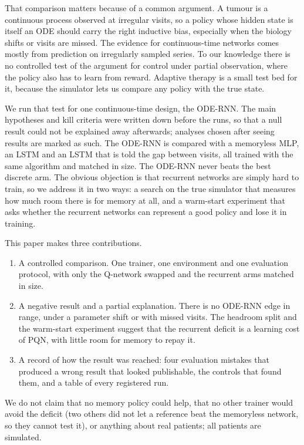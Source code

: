 \documentclass[10pt]{article}
\renewcommand{\cite}{\citep}
\begin{document}
That comparison matters because of a common argument. A tumour is a continuous
process observed at irregular visits, so a policy whose hidden state is itself
an ODE \cite{rubanova2019} should carry the right inductive bias, especially
when the biology shifts or visits are missed. The evidence for continuous-time
networks comes mostly from prediction on irregularly sampled series. To our knowledge
there is no controlled test of the argument for control under partial
observation, where the policy also has to learn from reward. Adaptive therapy is a small test bed
for it, because the simulator lets us compare any policy with the true state.

We run that test for one continuous-time design, the ODE-RNN. The main hypotheses and kill criteria were written down before the runs,
so that a null result could not be explained away afterwards; analyses chosen
after seeing results are marked as such. The ODE-RNN is compared with a memoryless MLP,
an LSTM and an LSTM that is told the gap between visits, all trained with the
same algorithm and matched in size. The ODE-RNN never beats the best discrete
arm. The obvious objection is that recurrent networks are simply hard to train,
so we address it in two ways: a search on the true simulator that measures how
much room there is for memory at all, and a warm-start experiment that asks
whether the recurrent networks can represent a good policy and lose it in
training.

This paper makes three contributions.
\begin{enumerate}
\item A controlled comparison. One trainer, one environment and one evaluation
protocol, with only the Q-network swapped and the recurrent arms matched in size.
\item A negative result and a partial explanation. There is no ODE-RNN edge in
range, under a parameter shift or with missed visits. The headroom split and the
warm-start experiment suggest that the recurrent deficit is a learning cost of
PQN, with little room for memory to repay it.
\item A record of how the result was reached: four evaluation mistakes that
produced a wrong result that looked publishable, the controls that found them,
and a table of every registered run.
\end{enumerate}
We do not claim that no memory policy could help, that no other trainer would
avoid the deficit (two others did not let a reference beat the memoryless
network, so they cannot test it), or anything about real patients; all patients are simulated.
\end{document}
